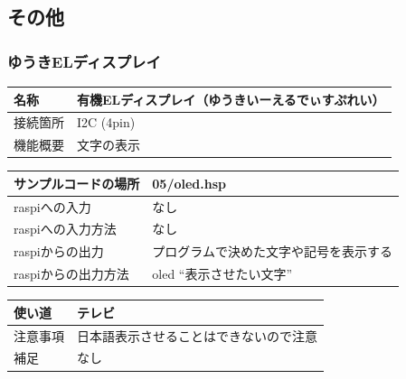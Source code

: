 \subsection{その他}
\subsubsection{ゆうきELディスプレイ}\label{oled}
\begin{table}[H]
	\begin{tabular}{|p{\colF}|p{\colG}|}	\hline
	名称 & 有機ELディスプレイ（ゆうきいーえるでぃすぷれい）\\ \hline
	接続箇所 & I2C (4pin)\\ \hline
	機能概要 & 文字の表示\\ \hline
  \end{tabular}
\end{table}

\begin{table}[H]
	\begin{tabular}{|p{\colF}|p{\colG}|}	\hline
	サンプルコードの場所 & 05/oled.hsp\\ \hline
	raspiへの入力 & なし\\ \hline
	raspiへの入力方法 & なし\\ \hline
	raspiからの出力 & プログラムで決めた文字や記号を表示する\\ \hline
	raspiからの出力方法 & oled “表示させたい文字”\\ \hline
  \end{tabular}
\end{table}

\begin{table}[H]
	\begin{tabular}{|p{\colF}|p{\colG}|} \hline
	使い道 & テレビ\\ \hline
	注意事項 & 日本語表示させることはできないので注意\\ \hline
	補足 & なし\\ \hline
  \end{tabular}
\end{table}

